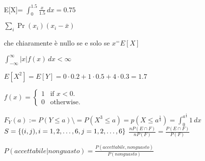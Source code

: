 \documentclass[]{article}
\begin{document}
    E[X]= $\int_{0}^{1.5} \frac{x}{1.5}\,dx = 0.75$
    
    $\sum_{i}^{} \Pr(x_i)(x_i - \bar{x}) $

    che chiaramente è nullo se e solo se $x^ = E[X]$

    $\int_ {-\infty }^{\infty} |x| f(x) \,dx < \infty$

    $E[X^2] = E[Y] = 0 \cdot 0.2 + 1 \cdot 0.5 + 4 \cdot 0.3 = 1.7$

    \begin{math}
        f(x)=\left\{
          \begin{array}{ll}
            1 & \mbox{if $x<0$}.\\
            0 & \mbox{otherwise}.
          \end{array}
        \right.
    \end{math}

    \begin{math} 
        F_Y(a) := P(Y \leq a) \setminus
            = P(X^3 \leq a)
            = p(X \leq a^\frac{1}{3})
            = \int_{0}^{a^\frac{1}{3}} 1 \,dx 
    \end{math}
    \linebreak
    $S = \{(i, j),  i = 1,2, \dots, 6,\space j = 1,2, \dots, 6\}$
    \linebreak
    $\frac{nP(E \cap F)}{nP(F)} = \frac{P(E \cap F)}{P(F)} $

    $P(accettabile | non guasto) = \frac{P(accettabile, non guasto)}{P(non guasto)}$
\end{document}
